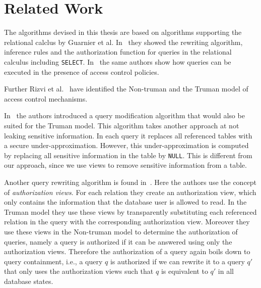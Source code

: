 \section{Related Work}

The algorithms devised in this thesis are based on algorithms supporting the relational calclus by Guarnier et al. In~\cite{guarnieri2016strong} they showed the rewriting algorithm, inference rules and the authorization function for queries in the relational calculus including \texttt{SELECT}.
%
In~\cite{guarnieri2014optimal} the same authors show how queries can be executed in the presence of access control policies.

Further Rizvi et al.~\cite{rizvi2004extending} have identified the Non-truman and the Truman model of access control mechanisms.

In~\cite{wang2007correctness} the authors introduced a query modification algorithm that would also be suited for the Truman model.
%
This algorithm takes another approach at not leaking sensitive information.
%
In each query it replaces all referenced tables with a secure under-approximation.
%
However, this under-approximation is computed by replacing all sensitive information in the table by \texttt{NULL}.
%
This is different from our approach, since we use views to remove sensitive information from a table.

Another query rewriting algorithm is found in~\cite{rizvi2004extending}. 
%
Here the authors use the concept of \emph{authorization views}.
%
For each relation they create an authorization view, which only contains the information that the database user is allowed to read.
%
In the Truman model they use these views by transparently substituting each referenced relation in the query with the corresponding authorization view.
%
Moreover they use these views in the Non-truman model to determine the authorization of queries, namely a query is authorized if it can be answered using only the authorization views.
%
Therefore the authorization of a query again boils down to query containment, i.e., a query $q$ is authorized if we can rewrite it to a query $q'$ that only uses the authorization views such that $q$ is equivalent to $q'$ in all database states.
